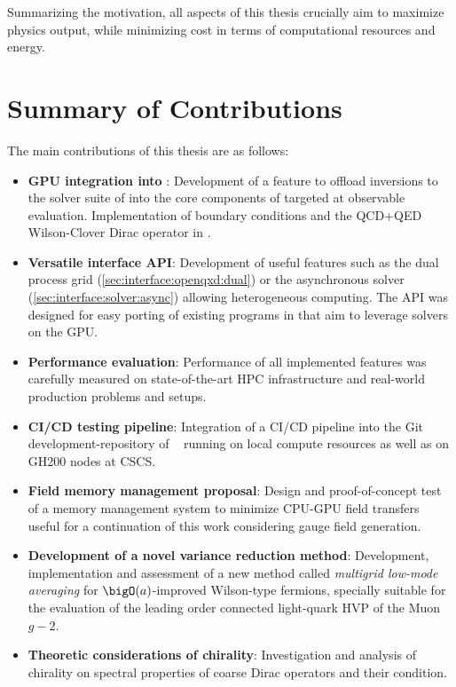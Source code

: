 Summarizing the motivation, all aspects of this thesis crucially aim to maximize physics output, while minimizing cost in terms of computational resources and energy.

\section{Summary of Contributions}

The main contributions of this thesis are as follows:

\begin{itemize}
   \item \textbf{GPU integration into \openqxd}: Development of a feature to offload inversions to the solver suite of \quda into the core components of \openqxd targeted at observable evaluation. Implementation of \Cstar boundary conditions and the QCD+QED Wilson-Clover Dirac operator in \quda.
   \item \textbf{Versatile interface API}: Development of useful features such as the dual process grid (\cref{sec:interface:openqxd:dual}) or the asynchronous solver (\cref{sec:interface:solver:async}) allowing heterogeneous computing. The API was designed for easy porting of existing programs in \openqxd that aim to leverage solvers on the GPU.
   \item \textbf{Performance evaluation}: Performance of all implemented features was carefully measured on state-of-the-art HPC infrastructure and real-world production problems and setups.
   \item \textbf{CI/CD testing pipeline}: Integration of a CI/CD pipeline into the Git development-repository of \openqxd~\cite{gitlab:openqxd-devel} running on local compute resources as well as on GH200 nodes at CSCS.
   \item \textbf{Field memory management proposal}: Design and proof-of-concept test of a memory management system to minimize CPU-GPU field transfers useful for a continuation of this work considering gauge field generation.
   \item \textbf{Development of a novel variance reduction method}: Development, implementation and assessment of a new method called \emph{multigrid low-mode averaging} for $\bigO(a)$-improved Wilson-type fermions, specially suitable for the evaluation of the leading order connected light-quark HVP of the Muon $g-2$.
   \item \textbf{Theoretic considerations of chirality}: Investigation and analysis of chirality on spectral properties of coarse Dirac operators and their condition.
\end{itemize}

